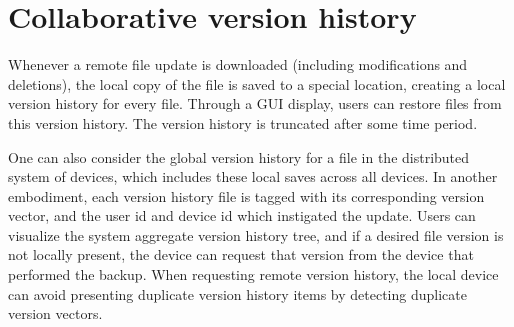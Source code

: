 \section*{Collaborative version history}
Whenever a remote file update is downloaded (including modifications and
deletions), the local copy of the file is saved to a special location,
creating a local version history for every file. Through a GUI display, users
can restore files from this version history. The version history is
truncated after some time period.

One can also consider the global version history for a file in the
distributed system of devices, which includes these local saves across all
devices. In another embodiment, each version history file is tagged with its
corresponding version vector, and the user id and device id which instigated the
update. Users can visualize the system aggregate version history tree, and if a
desired file version is not locally present, the device can request that version
from the device that performed the backup. When requesting remote version
history, the local device can avoid presenting duplicate version history items
by detecting duplicate version vectors.
